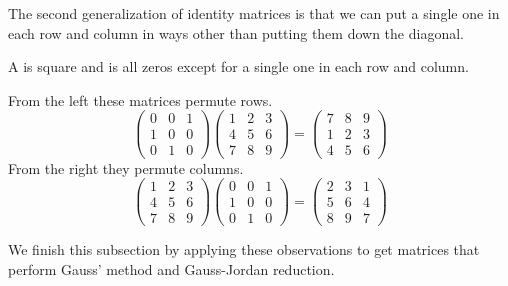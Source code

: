 The second generalization of identity matrices is that 
we can put a single one in each row and column
in ways other than putting them down the diagonal.

\begin{definition}
A %
is square and is all zeros except for
a single one in each row and column.
\end{definition}

\begin{example}
From the left these matrices permute rows.
\begin{equation*}
     \begin{pmatrix}
        0  &0  &1  \\
        1  &0  &0  \\
        0  &1  &0
     \end{pmatrix}
     \begin{pmatrix}
        1  &2  &3  \\
        4  &5  &6  \\
        7  &8  &9
     \end{pmatrix}
  =
     \begin{pmatrix}
        7  &8  &9  \\
        1  &2  &3  \\
        4  &5  &6
     \end{pmatrix}
\end{equation*}
From the right they permute columns.
\begin{equation*}
     \begin{pmatrix}
        1  &2  &3  \\
        4  &5  &6  \\
        7  &8  &9
     \end{pmatrix}
     \begin{pmatrix}
        0  &0  &1  \\
        1  &0  &0  \\
        0  &1  &0
     \end{pmatrix}
  =
     \begin{pmatrix}
        2  &3  &1  \\
        5  &6  &4  \\
        8  &9  &7
     \end{pmatrix}
\end{equation*}
\end{example}

We finish this subsection by applying these observations to get matrices 
that perform Gauss' method and Gauss-Jordan reduction.

